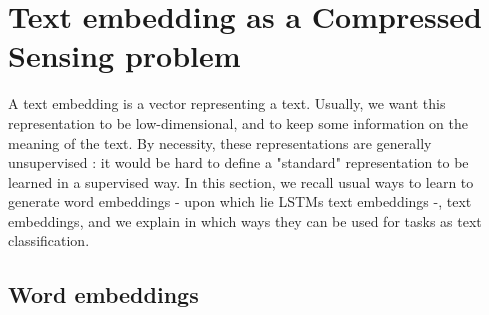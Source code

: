 \documentclass{article}
\begin{document}

\newpage 

\tableofcontents
\newpage
{}
\section{Text embedding as a Compressed Sensing problem}

A text embedding is a vector representing a text. Usually, 
we want this representation to be low-dimensional, and to 
keep some information on the meaning of the text. By necessity, 
these representations are generally unsupervised : it would be 
hard to define a "standard" representation to be learned in a 
supervised way. In this section, we recall usual ways to 
learn to generate word embeddings - upon which lie LSTMs text embeddings -, 
text embeddings, and we explain in which ways they can be used for 
tasks as text classification.


\subsection{Word embeddings}
\end{document}
